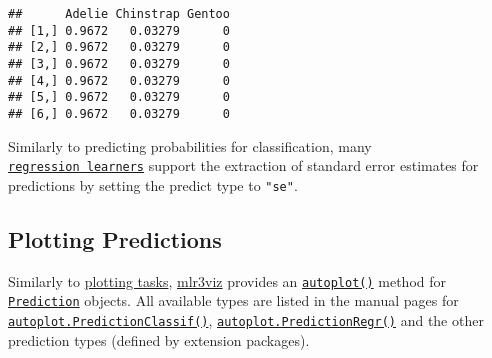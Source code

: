 \documentclass[
]{scrbook}
\newenvironment{Shaded}{\begin{snugshade}}{\end{snugshade}}
\newcommand{\AttributeTok}[1]{\textcolor[rgb]{0.77,0.63,0.00}{#1}}
\newcommand{\CommentTok}[1]{\textcolor[rgb]{0.56,0.35,0.01}{\textit{#1}}}
\newcommand{\FunctionTok}[1]{\textcolor[rgb]{0.00,0.00,0.00}{#1}}
\newcommand{\NormalTok}[1]{#1}
\newcommand{\OtherTok}[1]{\textcolor[rgb]{0.56,0.35,0.01}{#1}}
\newcommand{\SpecialCharTok}[1]{\textcolor[rgb]{0.00,0.00,0.00}{#1}}
\newcommand{\StringTok}[1]{\textcolor[rgb]{0.31,0.60,0.02}{#1}}
\renewenvironment{Shaded} {\begin{snugshade}\small} {\end{snugshade}}
\begin{document}
\begin{Shaded}
\end{Shaded}

\begin{verbatim}
##      Adelie Chinstrap Gentoo
## [1,] 0.9672   0.03279      0
## [2,] 0.9672   0.03279      0
## [3,] 0.9672   0.03279      0
## [4,] 0.9672   0.03279      0
## [5,] 0.9672   0.03279      0
## [6,] 0.9672   0.03279      0
\end{verbatim}

Similarly to predicting probabilities for classification, many \href{https://mlr3.mlr-org.com/reference/LearnerRegr.html}{\texttt{regression\ learners}} support the extraction of standard error estimates for predictions by setting the predict type to \texttt{"se"}.

\hypertarget{autoplot-prediction}{%
\subsection{Plotting Predictions}\label{autoplot-prediction}}

Similarly to \protect\hyperlink{autoplot-task}{plotting tasks}, \href{https://mlr3viz.mlr-org.com}{mlr3viz} provides an \href{https://www.rdocumentation.org/packages/ggplot2/topics/autoplot}{\texttt{autoplot()}} method for \href{https://mlr3.mlr-org.com/reference/Prediction.html}{\texttt{Prediction}} objects.
All available types are listed in the manual pages for \href{https://mlr3viz.mlr-org.com/reference/autoplot.PredictionClassif.html}{\texttt{autoplot.PredictionClassif()}}, \href{https://mlr3viz.mlr-org.com/reference/autoplot.PredictionRegr.html}{\texttt{autoplot.PredictionRegr()}} and the other prediction types (defined by extension packages).

\begin{Shaded}
\end{Shaded}
\end{document}
